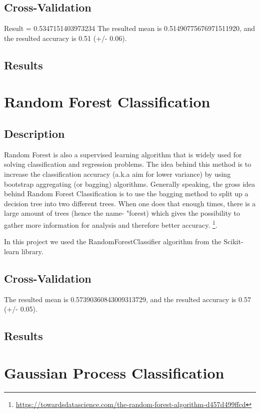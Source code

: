 \documentclass[twocolumn]{scrartcl}
\begin{document}
\subsection{Cross-Validation}
Result = 0.5347151403973234
The resulted mean is 0.51490775676971511920, and the resulted accuracy is 0.51 (+/- 0.06).
\subsection{Results}

\section{Random Forest Classification}
\subsection{Description}
Random Forest is also a supervised learning algorithm that is widely used for solving classification and regression problems. The idea behind this method is to increase the classification accuracy (a.k.a aim for lower variance) by using bootstrap aggregating (or bagging) algorithms. Generally speaking, the gross idea behind Random Forest Classification is to use the bagging method to split up a decision tree into two different trees. When one does that enough times, there is a large amount of trees (hence the name- "forest) which gives the possibility to gather more information for analysis and therefore better accuracy. \footnote{\url{https://towardsdatascience.com/the-random-forest-algorithm-d457d499ffcd}}.

In this project we used the RandomForestClassifier algorithm from the Scikit-learn library.
\subsection{Cross-Validation}
The resulted mean is 0.57390360843009313729, and the resulted accuracy is 0.57 (+/- 0.05).
\subsection{Results}

\section{Gaussian Process Classification}
\end{document}
